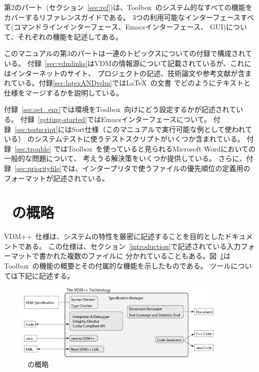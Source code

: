 \documentclass[\pformat,12pt]{jarticle}
\newcommand{\vdmslpp}{VDM++}
\newcommand{\Toolbox}{Toolbox}
\begin{document}
第2のパート~(セクション~\ref{sec:ref})は、\Toolbox\ のシステム的なすべての機能を
カバーするリファレンスガイドである。
3つの利用可能なインターフェースすべて(コマンドラインインターフェース、Emacsインターフェース、
GUI)について、それぞれの機能を記述してある。

このマニュアルの第3のパートは一連のトピックスについての付録で構成されている。
付録~\ref{sec:vdmlinks}はVDMの情報源について記載されているが、これにはインターネットのサイト、
プロジェクトの記述、技術論文や参考文献が含まれている。付録\ref{sec:latexANDvdm}では\LaTeX\ の文書
でどのようにテキストと仕様をマージするかを説明している。

付録~\ref{sec:set_env}では環境を\Toolbox\ 向けにどう設定するかが記述されている。
付録~\ref{getting-started}ではEmacsインターフェースについて。
付録~\ref{sec:testscript}にはSort仕様（このマニュアルで実行可能な例として使われている）
のシステムテストに使うテストスクリプトがいくつか含まれている。
付録~\ref{sec:trouble} では\Toolbox\ を使っていると見られるMicrosoft Wordにおいての一般的な問題について、
考えうる解決策をいくつか提供している。
{さらに、付録~\ref{sec:priorityfile}では、インタープリタで使うファイルの優先順位の定義用の
フォーマットが記述されている。}

\newpage

\section{\protect\VDMTools\ の概略}\label{sec:overview}


\vdmslpp\ 仕様は、システムの特性を厳密に記述することを目的としたドキュメントである。
この仕様は、セクション~\ref{introduction}で記述されている入力フォーマットで書かれた複数のファイルに
分かれていることもある。図~\ref{fig:toolbox}は\Toolbox\ の機能の概要とその付属的な機能を示したものである。
ツールについては下記に記述する。

\begin{figure}
\begin{center}
\includegraphics[width=10cm]{vdmtools_pp.png}
\caption{\protect\VDMTools\ の概略}
\label{fig:toolbox}
\end{center}
\end{figure}
\end{document}
